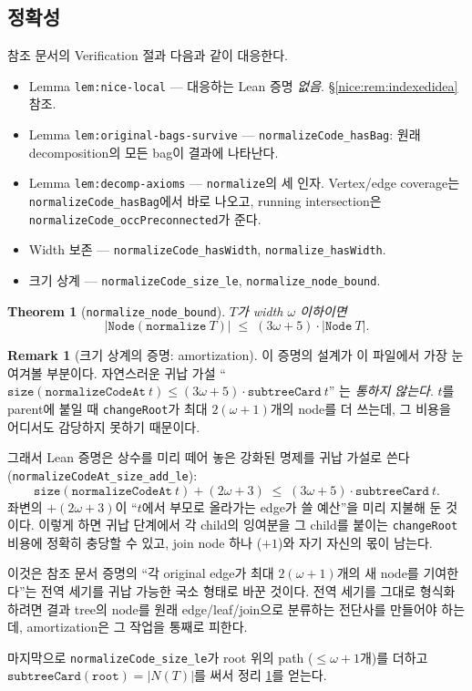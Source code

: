 \documentclass[11pt]{article}
\theoremstyle{definition}
\newtheorem{remark}[definition]{Remark}
\theoremstyle{plain}
\newtheorem{theorem}[definition]{Theorem}
\newcommand{\lean}[1]{\texttt{#1}}
\begin{document}
\subsection{정확성}

참조 문서의 Verification 절과 다음과 같이 대응한다.

\begin{itemize}
  \item Lemma \lean{lem:nice-local} --- 대응하는 Lean 증명 \emph{없음}.
    \S\ref{nice:rem:indexedidea} 참조.
  \item Lemma \lean{lem:original-bags-survive} --- \lean{normalizeCode\_hasBag}:
    원래 decomposition의 모든 bag이 결과에 나타난다.
  \item Lemma \lean{lem:decomp-axioms} --- \lean{normalize}의 세 인자.
    Vertex/edge coverage는 \lean{normalizeCode\_hasBag}에서 바로 나오고,
    running intersection은 \lean{normalizeCode\_occPreconnected}가 준다.
  \item Width 보존 --- \lean{normalizeCode\_hasWidth},
    \lean{normalize\_hasWidth}.
  \item 크기 상계 --- \lean{normalizeCode\_size\_le},
    \lean{normalize\_node\_bound}.
\end{itemize}

\begin{theorem}[\lean{normalize\_node\_bound}]
\label{nice:thm:nodebound}
$T$가 width $\omega$ 이하이면
\[
  |\lean{Node}(\lean{normalize}\ T)| \;\le\; (3\omega+5)\cdot|\lean{Node}\ T|.
\]
\end{theorem}

\begin{remark}[크기 상계의 증명: amortization]
\label{nice:rem:amortization}
이 증명의 설계가 이 파일에서 가장 눈여겨볼 부분이다. 자연스러운 귀납 가설
``$\lean{size}(\lean{normalizeCodeAt}\ t) \le (3\omega+5)\cdot\lean{subtreeCard}\ t$''
는 \emph{통하지 않는다}. $t$를 parent에 붙일 때 \lean{changeRoot}가 최대
$2(\omega+1)$개의 node를 더 쓰는데, 그 비용을 어디서도 감당하지 못하기
때문이다.

그래서 Lean 증명은 상수를 미리 떼어 놓은 강화된 명제를 귀납 가설로 쓴다
(\lean{normalizeCodeAt\_size\_add\_le}):
\[
  \lean{size}(\lean{normalizeCodeAt}\ t) + (2\omega+3)
    \;\le\; (3\omega+5)\cdot \lean{subtreeCard}\ t.
\]
좌변의 $+(2\omega+3)$이 ``$t$에서 부모로 올라가는 edge가 쓸 예산''을 미리
지불해 둔 것이다. 이렇게 하면 귀납 단계에서 각 child의 잉여분을 그 child를
붙이는 \lean{changeRoot} 비용에 정확히 충당할 수 있고, join node 하나
($+1$)와 자기 자신의 몫이 남는다.

이것은 참조 문서 증명의 ``각 original edge가 최대 $2(\omega+1)$개의 새 node를
기여한다''는 전역 세기를 귀납 가능한 국소 형태로 바꾼 것이다. 전역 세기를
그대로 형식화하려면 결과 tree의 node를 원래 edge/leaf/join으로 분류하는
전단사를 만들어야 하는데, amortization은 그 작업을 통째로 피한다.

마지막으로 \lean{normalizeCode\_size\_le}가 root 위의 path
($\le \omega+1$개)를 더하고 $\lean{subtreeCard}(\lean{root}) = |N(T)|$를 써서
정리 \ref{nice:thm:nodebound}를 얻는다.
\end{remark}
\end{document}
